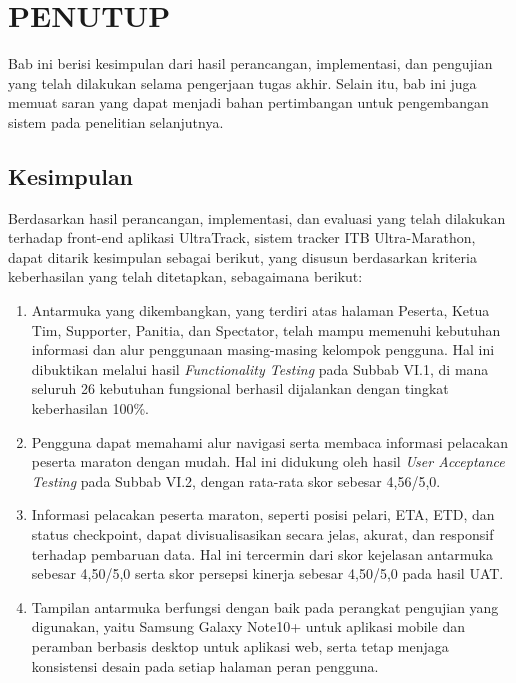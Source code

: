 \cleardoublepage
\chapter{PENUTUP}
\label{chap:penutup}
Bab ini berisi kesimpulan dari hasil perancangan, implementasi, dan pengujian yang telah dilakukan selama pengerjaan tugas akhir. Selain itu, bab ini juga memuat saran yang dapat menjadi bahan pertimbangan untuk pengembangan sistem pada penelitian selanjutnya.

\section{Kesimpulan}
Berdasarkan hasil perancangan, implementasi, dan evaluasi yang telah dilakukan terhadap front-end aplikasi UltraTrack, sistem tracker ITB Ultra-Marathon, dapat ditarik kesimpulan sebagai berikut, yang disusun berdasarkan kriteria keberhasilan yang telah ditetapkan, sebagaimana berikut:

\begin{enumerate}
    \item Antarmuka yang dikembangkan, yang terdiri atas halaman Peserta, Ketua Tim, Supporter, Panitia, dan Spectator, telah mampu memenuhi kebutuhan informasi dan alur penggunaan masing-masing kelompok pengguna. Hal ini dibuktikan melalui hasil \textit{Functionality Testing} pada Subbab VI.1, di mana seluruh 26 kebutuhan fungsional berhasil dijalankan dengan tingkat keberhasilan 100\%.
    \item Pengguna dapat memahami alur navigasi serta membaca informasi pelacakan peserta maraton dengan mudah. Hal ini didukung oleh hasil \textit{User Acceptance Testing} pada Subbab VI.2, dengan rata-rata skor sebesar 4,56/5,0.
    \item Informasi pelacakan peserta maraton, seperti posisi pelari, ETA, ETD, dan status checkpoint, dapat divisualisasikan secara jelas, akurat, dan responsif terhadap pembaruan data. Hal ini tercermin dari skor kejelasan antarmuka sebesar 4,50/5,0 serta skor persepsi kinerja sebesar 4,50/5,0 pada hasil UAT.
    \item Tampilan antarmuka berfungsi dengan baik pada perangkat pengujian yang digunakan, yaitu Samsung Galaxy Note10+ untuk aplikasi mobile dan peramban berbasis desktop untuk aplikasi web, serta tetap menjaga konsistensi desain pada setiap halaman peran pengguna.
\end{enumerate}

